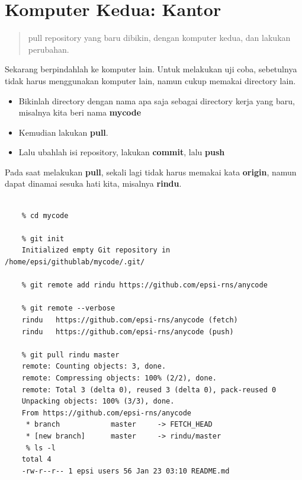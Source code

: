 \documentclass{article}
\begin{document}

\newpage

\section{Komputer Kedua: Kantor}

\begin{quote}
{pull} repository yang baru dibikin, dengan komputer kedua, dan lakukan perubahan.
\end{quote}

Sekarang berpindahlah ke komputer lain.
Untuk melakukan uji coba, sebetulnya tidak harus menggunakan komputer lain,
namun cukup memakai directory lain.

\begin{itemize}
\item Bikinlah directory dengan nama apa saja sebagai directory kerja yang baru,
misalnya kita beri nama \textbf{mycode}
\item Kemudian lakukan \textbf{pull}.
\item Lalu ubahlah isi repository, lakukan \textbf{commit}, lalu \textbf{push}
\end{itemize}

Pada saat melakukan \textbf{pull}, sekali lagi tidak harus
memakai kata \textbf{origin}, namun dapat dinamai sesuka hati kita,
misalnya \textbf{rindu}.

\begin{lstlisting}[style=BashInputStyle]
    % mkdir mycode

    % cd mycode

    % git init
    Initialized empty Git repository in /home/epsi/githublab/mycode/.git/

    % git remote add rindu https://github.com/epsi-rns/anycode

    % git remote --verbose
    rindu	https://github.com/epsi-rns/anycode (fetch)
    rindu	https://github.com/epsi-rns/anycode (push)

    % git pull rindu master
    remote: Counting objects: 3, done.
    remote: Compressing objects: 100% (2/2), done.
    remote: Total 3 (delta 0), reused 3 (delta 0), pack-reused 0
    Unpacking objects: 100% (3/3), done.
    From https://github.com/epsi-rns/anycode
     * branch            master     -> FETCH_HEAD
     * [new branch]      master     -> rindu/master
     % ls -l
    total 4
    -rw-r--r-- 1 epsi users 56 Jan 23 03:10 README.md
\end{lstlisting}
\end{document}
